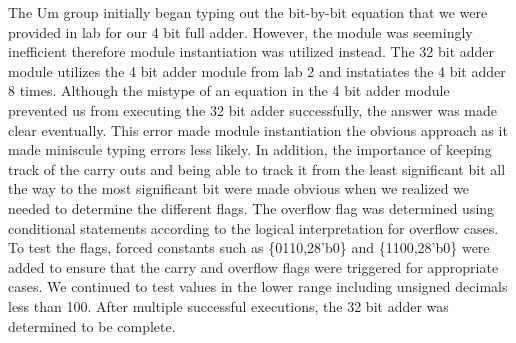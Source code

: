 \documentclass{article}
\begin{document}
The Um group initially began typing out the bit-by-bit equation that we were provided in lab for our 4 bit full adder. However, the module was seemingly inefficient therefore module instantiation was utilized instead. The 32 bit adder module utilizes the 4 bit adder module from lab 2 and instatiates the 4 bit adder 8 times. Although the mistype of an equation in the 4 bit adder module prevented us from executing the 32 bit adder successfully, the answer was made clear eventually. This error made module instantiation the obvious approach as it made miniscule typing errors less likely. In addition, the importance of keeping track of the carry outs and being able to track it from the least significant bit all the way to the most significant bit were made obvious when we realized we needed to determine the different flags. The overflow flag was determined using conditional statements according to the logical interpretation for overflow cases. To test the flags, forced constants such as \{0110,28'b0\} and \{1100,28'b0\} were added to ensure that the carry and overflow flags were triggered for appropriate cases. We continued to test values in the lower range including unsigned decimals less than 100. After multiple successful executions, the 32 bit adder was determined to be complete.
\end{document}
